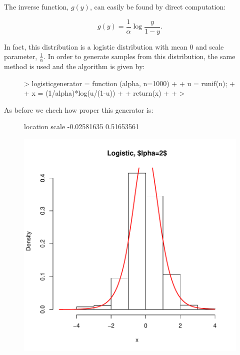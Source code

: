 \documentclass[12pt]{article}
\begin{document}
{{{{The inverse function, $g(y)$, can easily be found by direct computation:

\begin{equation}
g(y) = \frac{1}{\alpha} \log{\frac{y}{1-y}}.
\end{equation}

In fact, this distribution is a logistic distribution with mean 0 and scale parameter, $\frac{1}{\alpha}$.
In order to generate samples from this distribution, the same method is used and the algorithm is given by:

\begin{figure}[H]
\centering
\begin{Schunk}
\begin{Sinput}
> logisticgenerator = function (alpha, n=1000){
+ 
+   u = runif(n);
+ 
+   x = (1/alpha)*log(u/(1-u))
+ 
+   return(x)
+ 
+ }
> 
\end{Sinput}
\end{Schunk}
\end{figure}
As before we chech how proper this generator is:

\begin{figure}[H]
\centering
\begin{Schunk}
\begin{Soutput}
   location       scale 
-0.02581635  0.51653561 
\end{Soutput}
\end{Schunk}
\includegraphics{p1partC01v02-005}
\end{figure}

}}}}
\end{document}
